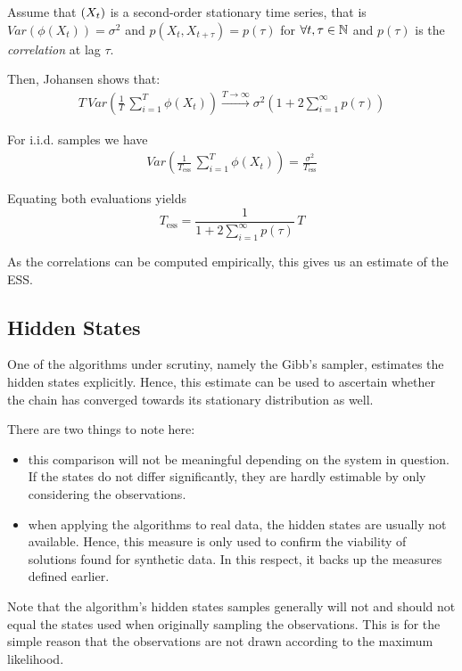Assume that $\left(X_t\right)$ is a second-order stationary time series, that is $Var \left( \phi(X_t)	\right) = \sigma^2$ and $p(X_t, X_{t+\tau}) = p(\tau)$ for $\forall t, \tau \in \mathbb{N}$ and $p(\tau)$ is the \textit{correlation} at lag $\tau$. 

Then, Johansen \cite{mcnotes} shows that:
\begin{align*}
	T \,  Var\left( 
		\frac{1}{T} \, \sum\limits_{i=1}^T \phi(X_t) 
	\right)
	\overset{T \rightarrow \infty}{\longrightarrow} 
	\sigma^2 \left(
		1 + 2 \sum\limits_{i=1}^\infty p(\tau)
	\right)
\end{align*}

For i.i.d. samples we have 
\begin{align*}
	 Var\left( 
	\frac{1}{T_{\text{ess}}} \, \sum\limits_{i=1}^T \phi(X_t) 
	\right) = \frac{\sigma^2}{T_{\text{ess}}}
\end{align*}

Equating both evaluations yields
\[
	T_{\text{ess}} = \frac{1}{	1 + 2 \sum\limits_{i=1}^\infty p(\tau)} \, T
\]

As the correlations can be computed empirically, this gives us an estimate of the ESS. 


\subsection{Hidden States}
One of the algorithms under scrutiny, namely the Gibb's sampler, estimates the hidden states explicitly. Hence, this estimate can be used to ascertain whether the chain has converged towards its stationary distribution as well.

There are two things to note here:
\begin{itemize}
\item  this comparison will not be meaningful depending on the system in question. \\
 If the states do not differ significantly, they are hardly estimable by only considering the observations.
\item when applying the algorithms to real data, the hidden states are usually not available. Hence, this measure is only used to confirm the viability of solutions found for synthetic data. In this respect, it backs up the measures defined earlier. 
\end{itemize}


Note that the algorithm's hidden states samples generally will not and should not equal the states used when originally sampling the observations. This is for the simple reason that the observations are not drawn according to the maximum likelihood.

